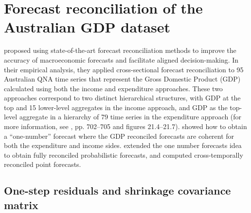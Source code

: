 \documentclass[a4paper,11pt]{article}
\theoremstyle{definition}
\begin{document}
\begin{table}[H]
	\centering
	\begingroup
	\fontsize{9}{11}\selectfont
	
	\endgroup
	\caption{Simulation experiment. ES ratio indices defined in Section 5.1. %
	Approaches performing worse than the benchmark (bootstrap base forecasts, ctjb) are highlighted in red, the best for each column is marked in bold, and the overall lowest value is highlighted in blue. The reconciliation approaches are described in Table 2.}
	\label{tab:ar2es_app_shr}
\end{table}

\newpage
\section{Forecast reconciliation of the Australian GDP dataset}

\cite{athanasopoulos2020} proposed using state-of-the-art forecast reconciliation methods to improve the accuracy of macroeconomic forecasts and facilitate aligned decision-making. 
In their empirical analysis, they applied cross-sectional forecast reconciliation to 95 Australian QNA time series that represent the Gross Domestic Product (GDP) calculated using both the income and expenditure approaches. These two approaches correspond to two distinct hierarchical structures, with GDP at the top and 15 lower-level aggregates in the income approach, and GDP as the top-level aggregate in a hierarchy of 79 time series in the expenditure approach (for more information, see \citealp{athanasopoulos2020}, pp. 702--705 and figures 21.4--21.7).
\cite{bisaglia2020} showed how to obtain a ``one-number'' forecast where the GDP reconciled forecasts are coherent for both the expenditure and income sides.
\cite{difonzo2022c, giro2022} extended the one number forecasts idea to obtain fully reconciled probabilistic forecasts, and \cite{difonzo2023} computed cross-temporally reconciled point forecasts. 

\subsection{One-step residuals and shrinkage covariance matrix}
\begin{table}[H]
	\centering
	\begingroup
	\fontsize{8}{10}\selectfont
	
	\endgroup
	\caption{AvgRelCRPS indices defined in Section 5.1 for the Australian QNA dataset. %
	Approaches performing worse than the benchmark (bootstrap base forecasts, ctjb) are highlighted in red, the best for each column is marked in bold, and the overall lowest value is highlighted in blue. The reconciliation approaches are described in Table 2.}
	\label{tab:auscrps}
\end{table}
\end{document}
